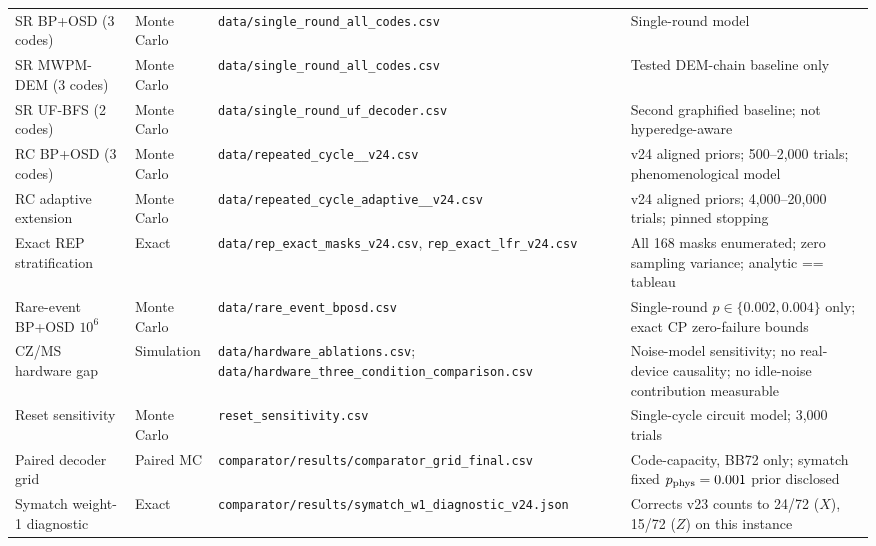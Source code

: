 \documentclass[11pt,a4paper]{article}
\begin{document}
\begin{longtable}{@{}>{\raggedright\arraybackslash}p{3.4cm}>{\raggedright\arraybackslash}p{1.6cm}>{\raggedright\arraybackslash}p{4.6cm}>{\raggedright\arraybackslash}p{4.4cm}@{}}
SR BP+OSD (3 codes) & Monte Carlo & \texttt{data/\allowbreak single\_\allowbreak round\_\allowbreak all\_\allowbreak codes.csv} & Single-round model \\
SR MWPM-DEM (3 codes) & Monte Carlo & \texttt{data/\allowbreak single\_\allowbreak round\_\allowbreak all\_\allowbreak codes.csv} & Tested DEM-chain baseline only \\
SR UF-BFS (2 codes) & Monte Carlo & \texttt{data/\allowbreak single\_\allowbreak round\_\allowbreak uf\_\allowbreak decoder.csv} & Second graphified baseline; not hyperedge-aware \\
RC BP+OSD (3 codes) & Monte Carlo & \texttt{data/\allowbreak repeated\_\allowbreak cycle\_\allowbreak *\_\allowbreak v24.csv} & v24 aligned priors; 500--2,000 trials; phenomenological model \\
RC adaptive extension & Monte Carlo & \texttt{data/\allowbreak repeated\_\allowbreak cycle\_\allowbreak adaptive\_\allowbreak *\_\allowbreak v24.csv} & v24 aligned priors; 4,000--20,000 trials; pinned stopping \\
Exact REP stratification & Exact & \texttt{data/\allowbreak rep\_\allowbreak exact\_\allowbreak masks\_\allowbreak v24.csv}, \texttt{rep\_\allowbreak exact\_\allowbreak lfr\_\allowbreak v24.csv} & All 168 masks enumerated; zero sampling variance; analytic == tableau \\
Rare-event BP+OSD $10^{6}$ & Monte Carlo & \texttt{data/\allowbreak rare\_\allowbreak event\_\allowbreak bposd.csv} & Single-round $p\in\{0.002,0.004\}$ only; exact CP zero-failure bounds \\
CZ/MS hardware gap & Simulation & \texttt{data/\allowbreak hardware\_\allowbreak ablations.csv}; \texttt{data/\allowbreak hardware\_\allowbreak three\_\allowbreak condition\_\allowbreak comparison.csv} & Noise-model sensitivity; no real-device causality; no idle-noise contribution measurable \\
Reset sensitivity & Monte Carlo & \texttt{reset\_\allowbreak sensitivity.csv} & Single-cycle circuit model; 3,000 trials \\
Paired decoder grid & Paired MC & \texttt{comparator/\allowbreak results/\allowbreak comparator\_\allowbreak grid\_\allowbreak final.csv} & Code-capacity, BB72 only; symatch fixed $p_{\rm phys}=0.001$ prior disclosed \\
Symatch weight-1 diagnostic & Exact & \texttt{comparator/\allowbreak results/\allowbreak symatch\_\allowbreak w1\_\allowbreak diagnostic\_\allowbreak v24.json} & Corrects v23 counts to 24/72 ($X$), 15/72 ($Z$) on this instance \\

\end{longtable}
\end{document}
